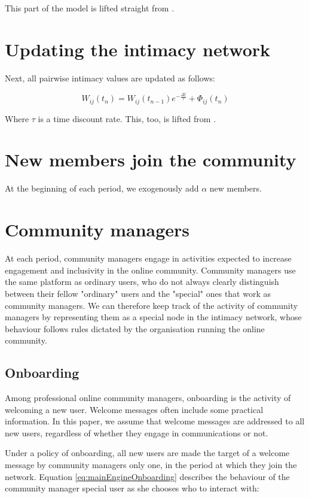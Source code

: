 \documentclass{article}
\begin{document}
This part of the model is lifted straight from \cite{kim2015group}. 

\section{Updating the intimacy network}

Next, all pairwise intimacy values are updated as follows:

\begin{equation}
	W_{ij}(t_n) = W_{ij}(t_{n-1})e^{-\frac{\Delta t}{\tau}} + \Phi_{ij}(t_n)
	\label{eq:updating}
\end{equation}

Where $\tau$ is a time discount rate. This, too, is lifted from \cite{kim2015group}.

\section{New members join the community}

At the beginning of each period, we exogenously add $\alpha$ new members.

\section{Community managers}

At each period, community managers engage in activities expected to increase engagement and inclusivity in the online community. Community managers use the same platform as ordinary users, who do not always clearly distinguish between their fellow "ordinary" users and the "special" ones that work as community managers. We can therefore keep track of the activity of community managers by representing them as a special node in the intimacy network, whose behaviour follows rules dictated by the organisation running the online community.

\subsection{Onboarding}

Among professional online community managers, onboarding is the activity of welcoming a new user. Welcome messages often include some practical information. In this paper, we assume that welcome messages are addressed to all new users, regardless of whether they engage in communications or not. 

Under a policy of onboarding, all new users are made the target of a welcome message by community managers only one, in the period at which they join the network.  Equation \ref{eq:mainEngineOnboarding}  describes the behaviour of the community manager special user as she chooses who to interact with: 
\end{document}
